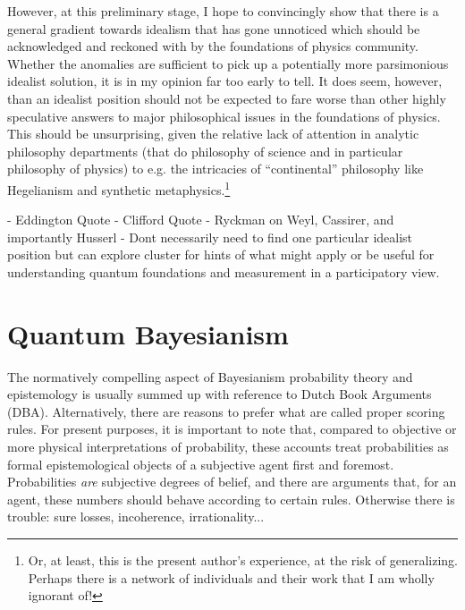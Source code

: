 \documentclass{article}
\begin{document}
However, at this preliminary stage, I hope to convincingly show that there is a general gradient towards idealism that has gone unnoticed which should be acknowledged and reckoned with by the foundations of physics community.  Whether the anomalies are sufficient to pick up a potentially more parsimonious idealist solution, it is in my opinion far too early to tell.  It does seem, however, than an idealist position should not be expected to fare worse than other highly speculative answers to major philosophical issues in the foundations of physics.  This should be unsurprising, given the relative lack of attention in analytic philosophy departments (that do philosophy of science and in particular philosophy of physics) to e.g. the intricacies of ``continental'' philosophy like Hegelianism and synthetic metaphysics.\footnote{Or, at least, this is the present author's experience, at the risk of generalizing.  Perhaps there is a network of individuals and their work that I am wholly ignorant of!}


- Eddington Quote
- Clifford Quote
- Ryckman on Weyl, Cassirer, and importantly Husserl
- Dont necessarily need to find one particular idealist position but can explore cluster for hints of what might apply or be useful for understanding quantum foundations and measurement in a participatory view.




\section{Quantum Bayesianism}

The normatively compelling aspect of Bayesianism probability theory and epistemology is usually summed up with reference to Dutch Book Arguments (DBA).  Alternatively, there are reasons to prefer what are called proper scoring rules.  For present purposes, it is important to note that, compared to objective or more physical interpretations of probability, these accounts treat probabilities as formal epistemological objects of a subjective agent first and foremost.  Probabilities \emph{are} subjective degrees of belief, and there are arguments that, for an agent, these numbers should behave according to certain rules.  Otherwise there is trouble: sure losses, incoherence, irrationality...
\end{document}

